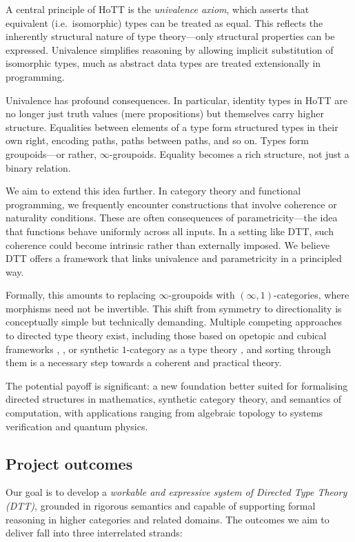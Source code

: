 \documentclass[a4paper,11pt]{article}
\begin{document}
A central principle of HoTT is the \emph{univalence axiom}, which asserts
that equivalent (i.e.\ isomorphic) types can be treated as equal. This
reflects the inherently structural nature of type theory—only
structural
properties can be expressed. Univalence
simplifies reasoning by allowing implicit substitution of isomorphic
types, much as abstract data types are treated extensionally in
programming.

Univalence has profound consequences. In particular, identity types in
HoTT are no longer just truth values (mere propositions) but
themselves carry higher structure. Equalities between elements of a
type form structured types in their own right, encoding paths, paths
between paths, and so on. Types form groupoids—or rather,
$\infty$-groupoids. Equality becomes a rich structure, not just a
binary relation.

We aim to extend this idea further. In category theory and functional
programming, we frequently encounter constructions that involve
coherence or naturality conditions. These are often consequences of
parametricity—the idea that functions behave uniformly across all
inputs. In a setting like DTT, such coherence could become intrinsic
rather than externally imposed. We believe DTT offers a framework that
links univalence and parametricity in a principled way.

Formally, this amounts to replacing $\infty$-groupoids with
$(\infty,1)$-categories, where morphisms need not be invertible. This
shift from symmetry to directionality is conceptually simple but
technically demanding. Multiple competing approaches to directed type
theory exist, including those based on opetopic and cubical frameworks
\cite{riehlshulman2017}, \cite{licata2016}, or synthetic
$1$-category as a type theory \cite{licata:2011,north_2019,altenkirch_neumann_2024},
and sorting through them is a necessary step towards a coherent and practical theory.

The potential payoff is significant: a new foundation better suited
for formalising directed structures in mathematics, synthetic category
theory, and semantics of computation, with applications ranging from
algebraic topology to systems verification and quantum physics.

\subsection{Project outcomes}\label{project-outcomes}

Our goal is to develop a \emph{workable and expressive system of Directed Type Theory (DTT)}, grounded in rigorous semantics and capable of supporting formal reasoning in higher categories and related domains. The outcomes we aim to deliver fall into three interrelated strands:
\end{document}
